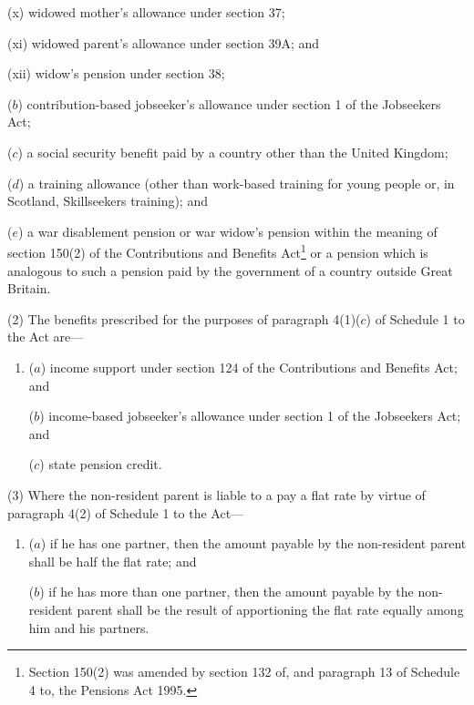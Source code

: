 \documentclass[12pt,a4paper]{article}
\begin{document}
\begin{enumerate}
\begin{enumerate}
(x) widowed mother’s allowance under section 37;

(xi) widowed parent’s allowance under section 39A; and

(xii) widow’s pension under section 38;
\end{enumerate}

($b$) contribution-based jobseeker’s allowance under section 1 of the Jobseekers Act;

($c$) a social security benefit paid by a country other than the United Kingdom;

($d$) a training allowance (other than work-based training for young people or, in Scotland, Skillseekers training); and

($e$) a war disablement pension or war widow’s pension within the meaning of section 150(2) of the Contributions and Benefits Act\footnote{Section 150(2) was amended by section 132 of, and paragraph 13 of Schedule 4 to, the Pensions Act 1995.} or a pension which is analogous to such a pension paid by the government of a country outside Great Britain.
\end{enumerate}

(2) The benefits prescribed for the purposes of paragraph 4(1)($c$)  of Schedule 1 to the Act are—
\begin{enumerate}\item[]
($a$) income support under section 124 of the Contributions and Benefits Act; and

($b$) income-based jobseeker’s allowance under section 1 of the Jobseekers Act;
%
and

    ($c$) 
    state pension credit.
\end{enumerate}

(3) Where the non-resident parent is liable to a pay a flat rate by virtue of paragraph 4(2) of Schedule 1 to the Act—
\begin{enumerate}\item[]
($a$) if he has one partner, then the amount payable by the non-resident parent shall be half the flat rate; and

($b$) if he has more than one partner, then the amount payable by the non-resident parent shall be the result of apportioning the flat rate equally among him and his partners.
\end{enumerate}

\end{document}
